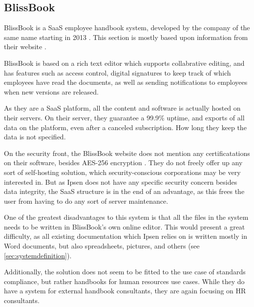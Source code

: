\subsection{BlissBook}
BlissBook is a SaaS employee handbook system, developed by the company of the same name starting in 2013 \cite{BlissbookInfo}.
This section is mostly based upon information from their website \cite{BlissbookContents}.

BlissBook is based on a rich text editor which supports collabrative editing, and has features such as access control, digital signatures to keep track of which employees have read the documents, as well as sending notifications to employees when new versions are released.

As they are a SaaS platform, all the content and software is actually hosted on their servers.
On their server, they guarantee a 99.9\% uptime, and exports of all data on the platform, even after a canceled subscription.
How long they keep the data is not specified.

On the security front, the BlissBook website does not mention any certificatations on their software, besides  AES-256 encryption \cite{BlissbookSecurity}.
They do not freely offer up any sort of self-hosting solution, which security-conscious corporations may be very interested in.
But as Ipsen does not have any specific security concern besides data integrity, the SaaS structure is in the end of an advantage, as this frees the user from having to do any sort of server maintenance.

One of the greatest disadvantages to this system is that all the files in the system needs to be written in BlissBook's own online editor.
This would present a great difficulty, as all existing documentation which Ipsen relies on is written mostly in Word documents, but also spreadsheets, pictures, and others (see \cref{sec:systemdefinition}).

Additionally, the solution does not seem to be fitted to the use case of standards compliance, but rather handbooks for human resources use cases.
While they do have a system for external handbook consultants, they are again focusing on HR consultants. \cite{BlissbookHandbook}
